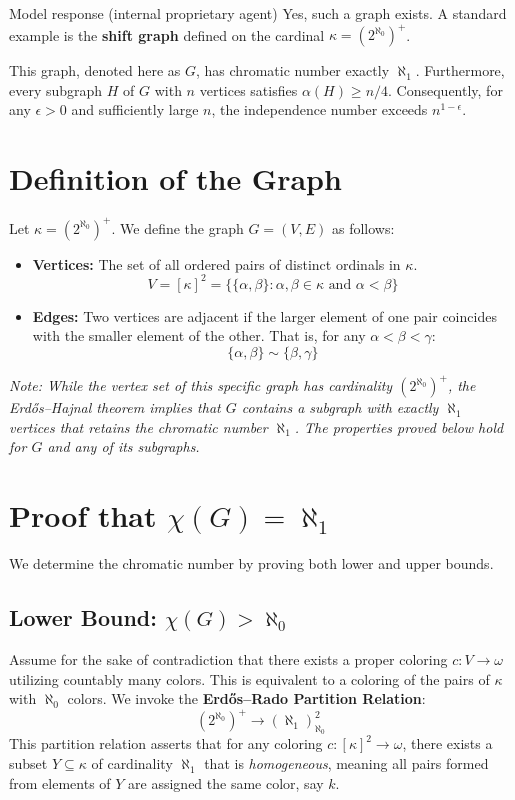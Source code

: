 \documentclass[11pt]{article}
\begin{document}
\begin{solution}{Model response (internal proprietary agent)}
Yes, such a graph exists. A standard example is the \textbf{shift graph} defined on the cardinal $\kappa = (2^{\aleph_0})^+$.

This graph, denoted here as $G$, has chromatic number exactly $\aleph_1$. Furthermore, every subgraph $H$ of $G$ with $n$ vertices satisfies $\alpha(H) \ge n/4$. Consequently, for any $\epsilon > 0$ and sufficiently large $n$, the independence number exceeds $n^{1-\epsilon}$.

\section{Definition of the Graph}

Let $\kappa = (2^{\aleph_0})^+$. We define the graph $G = (V, E)$ as follows:

\begin{itemize}
    \item \textbf{Vertices:} The set of all ordered pairs of distinct ordinals in $\kappa$.
    \[ V = [\kappa]^2 = \bigl\{ \{\alpha, \beta\} : \alpha, \beta \in \kappa \text{ and } \alpha < \beta \bigr\} \]
    \item \textbf{Edges:} Two vertices are adjacent if the larger element of one pair coincides with the smaller element of the other. That is, for any $\alpha < \beta < \gamma$:
    \[ \{\alpha, \beta\} \sim \{\beta, \gamma\} \]
\end{itemize}

\textit{Note: While the vertex set of this specific graph has cardinality $(2^{\aleph_0})^+$, the Erdős–Hajnal theorem implies that $G$ contains a subgraph with exactly $\aleph_1$ vertices that retains the chromatic number $\aleph_1$. The properties proved below hold for $G$ and any of its subgraphs.}

\section{Proof that $\chi(G) = \aleph_1$}

We determine the chromatic number by proving both lower and upper bounds.

\subsection*{Lower Bound: $\chi(G) > \aleph_0$}

Assume for the sake of contradiction that there exists a proper coloring $c: V \to \omega$ utilizing countably many colors. This is equivalent to a coloring of the pairs of $\kappa$ with $\aleph_0$ colors. We invoke the \textbf{Erdős–Rado Partition Relation}:
\[ (2^{\aleph_0})^+ \to (\aleph_1)^2_{\aleph_0} \]
This partition relation asserts that for any coloring $c: [\kappa]^2 \to \omega$, there exists a subset $Y \subseteq \kappa$ of cardinality $\aleph_1$ that is \textit{homogeneous}, meaning all pairs formed from elements of $Y$ are assigned the same color, say $k$.


\end{solution}
\end{document}

